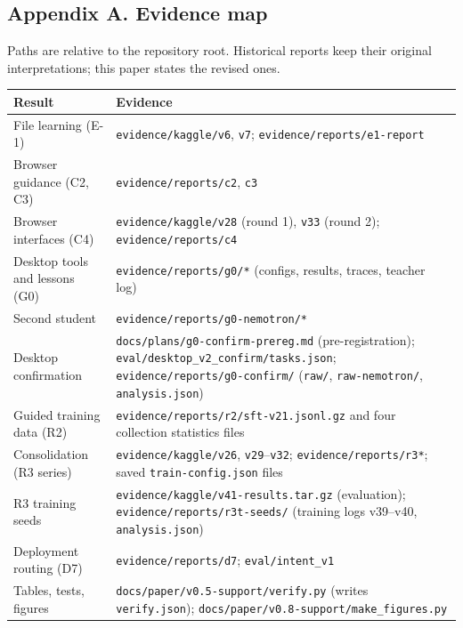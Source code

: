 \documentclass[
  10pt,
]{article}
\newcounter{none} %
\begin{document}
\normalsize

\subsection{Appendix A. Evidence map}\label{appendix-a.-evidence-map}

Paths are relative to the repository root. Historical reports keep their
original interpretations; this paper states the revised ones.

{\def\LTcaptype{none} %
\begin{longtable}[]{@{}
  >{\raggedright\arraybackslash}p{}
  >{\raggedright\arraybackslash}p{}@{}}
\toprule\noalign{}
\begin{minipage}[b]{\linewidth}\raggedright
Result
\end{minipage} & \begin{minipage}[b]{\linewidth}\raggedright
Evidence
\end{minipage} \\
\midrule\noalign{}
\endhead
\bottomrule\noalign{}
\endlastfoot
File learning (E-1) & \texttt{evidence/kaggle/v6}, \texttt{v7};
\texttt{evidence/reports/e1-report} \\
Browser guidance (C2, C3) & \texttt{evidence/reports/c2}, \texttt{c3} \\
Browser interfaces (C4) & \texttt{evidence/kaggle/v28} (round 1),
\texttt{v33} (round 2); \texttt{evidence/reports/c4} \\
Desktop tools and lessons (G0) & \texttt{evidence/reports/g0/*}
(configs, results, traces, teacher log) \\
Second student & \texttt{evidence/reports/g0-nemotron/*} \\
Desktop confirmation & \texttt{docs/plans/g0-confirm-prereg.md}
(pre-registration); \texttt{eval/desktop\_v2\_confirm/tasks.json};
\texttt{evidence/reports/g0-confirm/} (\texttt{raw/},
\texttt{raw-nemotron/}, \texttt{analysis.json}) \\
Guided training data (R2) &
\texttt{evidence/reports/r2/sft-v21.jsonl.gz} and four collection
statistics files \\
Consolidation (R3 series) & \texttt{evidence/kaggle/v26},
\texttt{v29}--\texttt{v32}; \texttt{evidence/reports/r3*}; saved
\texttt{train-config.json} files \\
R3 training seeds & \texttt{evidence/kaggle/v41-results.tar.gz}
(evaluation); \texttt{evidence/reports/r3t-seeds/} (training logs
v39--v40, \texttt{analysis.json}) \\
Deployment routing (D7) & \texttt{evidence/reports/d7};
\texttt{eval/intent\_v1} \\
Tables, tests, figures & \texttt{docs/paper/v0.5-support/verify.py}
(writes \texttt{verify.json});
\texttt{docs/paper/v0.8-support/make\_figures.py} \\
\end{longtable}
}
\end{document}
